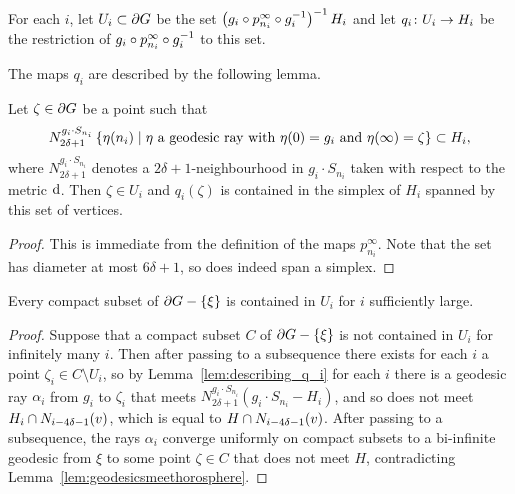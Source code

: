 \documentclass[a4paper]{article}
\begin{document}
\begin{definition}
  For each $i$, let $U_i \subset \partial G$ be the set $\left(g_i \circ
  p^\infty_{n_i} \circ g_i^{-1}\right)^{-1} H_i$ and let $q_i \colon U_i \to
  H_i$ be the restriction of $g_i \circ p^\infty_{n_i}\circ g_i^{-1}$
  to this set.
\end{definition}

The maps $q_i$ are described by the following lemma.

\begin{lemma}\label{lem:describing_q_i}
  Let $\zeta \in \partial G$ be a point such that
  \begin{equation*}
    N_{2\delta+1}^{g_i\cdot S_{n_i}} \left\{\eta(n_i)\mid\text{$\eta$ a geodesic ray with
        $\eta(0) = g_i$ and $\eta(\infty) = \zeta$}\right\} \subset H_i,
  \end{equation*}
  where $N_{2\delta+1}^{g_i\cdot S_{n_i}}$ denotes a $2\delta+1$-neighbourhood
  in $g_i\cdot S_{n_i}$ taken with respect to the metric $\operatorname{d}$.
  Then $\zeta \in U_i$ and $q_i(\zeta)$ is contained in the simplex of $H_i$
  spanned by this set of vertices.
\end{lemma}

\begin{proof}
  This is immediate from the definition of the maps $p^\infty_{n_i}$. Note that
  the set has diameter at most $6\delta+1$, so does indeed span a simplex.
\end{proof}

\begin{lemma}
  Every compact subset of $\partial G - \left\{\xi\right\}$ is contained in $U_i$ for 
  $i$ sufficiently large.
\end{lemma} 

\begin{proof}
  Suppose that a compact subset $C$ of $\partial G - \left\{\xi\right\}$ is not contained
  in $U_i$ for infinitely many $i$. Then after passing to a subsequence there
  exists for each $i$ a point $\zeta_i \in C\setminus U_i$, so by
  Lemma~\ref{lem:describing_q_i} for each $i$ there is a geodesic ray
  $\alpha_i$ from $g_i$ to $\zeta_i$ that meets $N_{2\delta+1}^{g_i\cdot
  S_{n_i}}(g_i\cdot S_{n_i} - H_i)$, and so does not meet $H_i\cap
  N_{i-4\delta-1}(v)$, which is equal to $H \cap N_{i-4\delta-1}(v)$.
  After passing to a subsequence, the rays $\alpha_i$ converge uniformly on
  compact subsets to a bi-infinite geodesic from $\xi$ to some point $\zeta \in
  C$ that does not meet $H$, contradicting
  Lemma~\ref{lem:geodesicsmeethorosphere}.
\end{proof}
\end{document}
